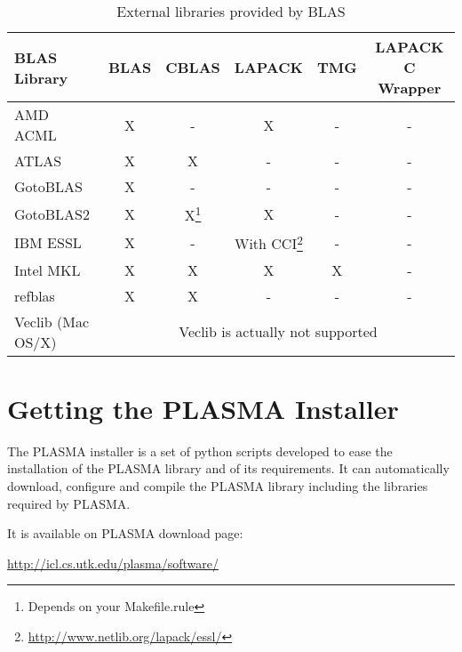 \begin{table}[!htb]
  \centering
  \caption{External libraries provided by BLAS}
  \label{tab:extlibs}  
  
  \begin{tabular}{| l | c | c | c | c | c |}
    \hline
    \bf{BLAS Library}& \bf{BLAS} & \bf{CBLAS} & \bf{LAPACK}   & \bf{TMG} & \bf{LAPACK C Wrapper} \\
    \hline
    AMD ACML         &    X      &     -      &       X       &     -    &       -               \\
    \hline
    ATLAS            &    X      &     X      &       -       &     -    &       -               \\
    \hline
    GotoBLAS         &    X      &     -      &       -       &     -    &       -               \\
    \hline
    GotoBLAS2        &    X      &     X\footnote{Depends on your Makefile.rule}      &       X       &     -    &       -   \\
    \hline
    IBM ESSL         &    X      &     -      &    With CCI\footnote{\url{http://www.netlib.org/lapack/essl/}} &     -    &       -               \\
    \hline
    Intel MKL        &    X      &     X      &       X       &     X    &       -               \\
    \hline                                                                       
    refblas          &    X      &     X      &       -       &     -    &       -               \\
    \hline
    Veclib (Mac OS/X)&    \multicolumn{5}{c|}{Veclib is actually not supported}                  \\
    \hline
  \end{tabular}

\end{table}


\section{Getting the PLASMA Installer}

The PLASMA installer is a set of python scripts developed to ease
the installation of the PLASMA library and of its requirements. It can
automatically download, configure and compile the PLASMA library
including the libraries required by PLASMA.

It is available on PLASMA download page:
\begin{link_url}
\url{http://icl.cs.utk.edu/plasma/software/}
\end{link_url}

